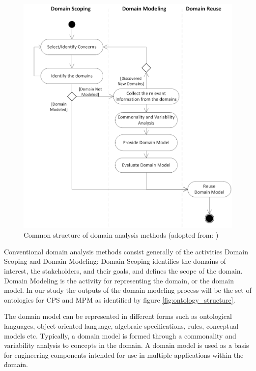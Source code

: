 \documentclass[final]{include/MPM4CPS/MPM4CPS-Report} %
\newcommand{\uidx}[1]{\index[used]{#1}}  %
\begin{document}
\begin{figure}[!htb]
\includegraphics[width=\textwidth]{figures/domain_analysis_methods.png}
\caption{Common structure of domain analysis methods (adopted from:
\cite{Tekinerdogan2013})}
\label{fig:domain_analysis_methods}
\end{figure}

Conventional domain analysis methods consist generally of the activities Domain
Scoping  and Domain Modeling: Domain Scoping identifies the domains of
interest, the stakeholders\uidx{Stakeholder}, and their goals, and defines the scope of the
domain. Domain Modeling is the activity for representing the domain, or the
domain model. In our study the outputs of the domain modeling process\uidx{Process} will be the set of ontologies for CPS and MPM as identified by figure \ref{fig:ontology_structure}.

The domain model can be represented in different forms such as ontological
languages, object-oriented language, algebraic specifications, rules, conceptual
models etc. Typically, a domain model is formed through a commonality and
variability analysis to concepts in the domain. A domain model is used as a
basis for engineering components intended for use in multiple applications
within the domain.
\end{document}
